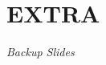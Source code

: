 \documentclass[handout,10pt]{beamer}
\begin{document}


\appendix
\section{EXTRA}
\begin{frame}
	\begin{center}
	\Huge\emph{Backup Slides}
	\end{center}
\end{frame}
\addtocounter{framenumber}{-1}
\end{document}
